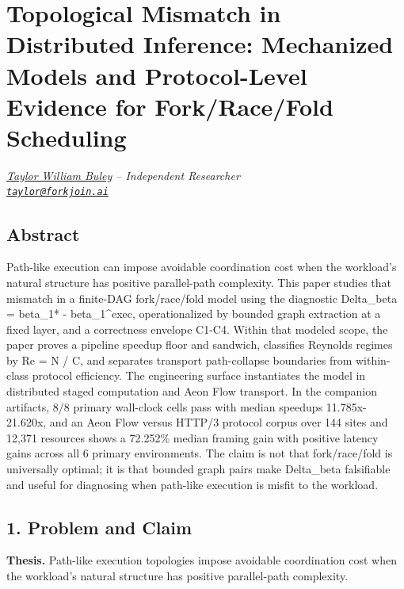 \documentclass[
  11pt,
]{article}
\author{}
\date{}
\begin{document}
\section{Topological Mismatch in Distributed Inference: Mechanized
Models and Protocol-Level Evidence for Fork/Race/Fold
Scheduling}\label{topological-mismatch-in-distributed-inference-mechanized-models-and-protocol-level-evidence-for-forkracefold-scheduling}

\emph{\href{https://www.patreon.com/cw/twbuley}{Taylor William Buley} --
Independent Researcher}\\
\emph{\href{mailto:taylor@forkjoin.ai}{\nolinkurl{taylor@forkjoin.ai}}}

\subsection{Abstract}\label{abstract}

Path-like execution can impose avoidable coordination cost when the
workload's natural structure has positive parallel-path complexity. This
paper studies that mismatch in a finite-DAG fork/race/fold model using
the diagnostic Delta\_beta = beta\_1* - beta\_1\^{}exec, operationalized
by bounded graph extraction at a fixed layer, and a correctness envelope
C1-C4. Within that modeled scope, the paper proves a pipeline speedup
floor and sandwich, classifies Reynolds regimes by Re = N / C, and
separates transport path-collapse boundaries from within-class protocol
efficiency. The engineering surface instantiates the model in
distributed staged computation and Aeon Flow transport. In the companion
artifacts, 8/8 primary wall-clock cells pass with median speedups
11.785x-21.620x, and an Aeon Flow versus HTTP/3 protocol corpus over 144
sites and 12,371 resources shows a 72.252\% median framing gain with
positive latency gains across all 6 primary environments. The claim is
not that fork/race/fold is universally optimal; it is that bounded graph
pairs make Delta\_beta falsifiable and useful for diagnosing when
path-like execution is misfit to the workload.

\subsection{1. Problem and Claim}\label{problem-and-claim}

\textbf{Thesis.} Path-like execution topologies impose avoidable
coordination cost when the workload's natural structure has positive
parallel-path complexity.
\end{document}
